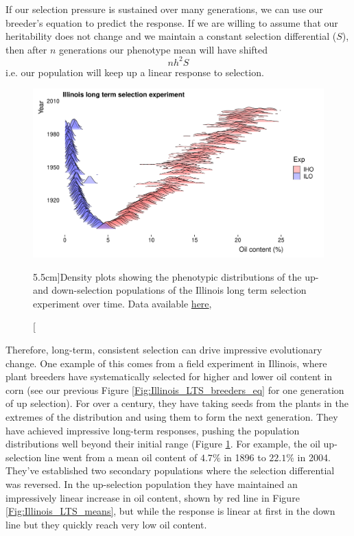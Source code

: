 If our selection pressure is sustained over many generations, we can
use our breeder's equation to predict the response. If we are willing
to assume that our heritability does not change and we maintain a constant selection
differential ($S$), then after $n$ generations our phenotype mean will have
shifted 
\begin{equation}
n h^2 S
\end{equation}
i.e. our population will keep up a linear response to selection.
 \begin{figure}
 \begin{center}
   \includegraphics[width=\textwidth]{Journal_figs/Quant_gen/Illinois_long_term_selection_corn/Illinois_LTS_ggridges_distribution.pdf}\end{center}
 \caption[][5.5cm]{Density plots showing the phenotypic distributions of the
   up- and down-selection populations of the Illinois long term
   selection experiment over time. Data available
   \href{https://www.ideals.illinois.edu/handle/2142/3525}{here}, }\label{Fig:Illinois_LTS_dists}
 \end{figure}
Therefore, long-term, consistent selection can drive impressive
evolutionary change. One example of this comes from a field experiment
in Illinois, where plant breeders have systematically selected for
higher and lower oil content in corn (see our previous Figure
\ref{Fig:Illinois_LTS_breeders_eq} for one generation of up selection). For over a century, they have taking seeds from the plants
in the extremes of the distribution and using them to form the next
generation. They have achieved impressive long-term responses, pushing
the population distributions well beyond their initial range (Figure
\ref{Fig:Illinois_LTS_dists}. For example, the oil up-selection line went from a mean oil content of
$4.7\%$ in 1896 to $22.1\%$ in 2004.  They've established
two secondary populations where the selection differential was reversed. In the up-selection population they have maintained an
impressively linear increase in oil content, shown by red line in
Figure \ref{Fig:Illinois_LTS_means}, but while the
response is linear at first in the down line but they quickly reach
very low oil content.

